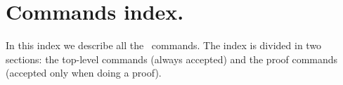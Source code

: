 

\chapter{Commands index.}\label{cmd}

In this index we describe all the \AFD\ commands. The index is divided in two
sections: the top-level commands (always accepted) and the proof commands
(accepted only when doing a proof).
  







